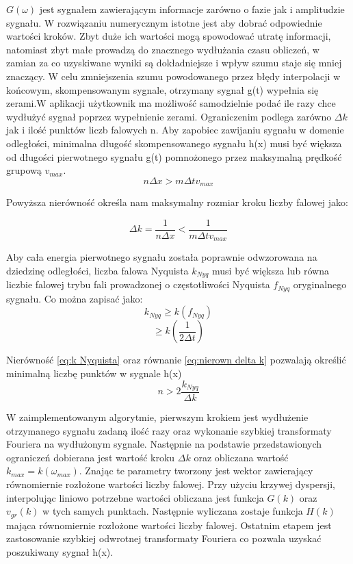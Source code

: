 $G(\omega)$ jest sygnałem zawierającym informacje zarówno o fazie jak i amplitudzie sygnału. W rozwiązaniu numerycznym istotne jest aby dobrać odpowiednie wartości kroków. Zbyt duże ich wartości mogą spowodować utratę informacji, natomiast zbyt małe prowadzą do znacznego wydłużania czasu obliczeń, w zamian za co uzyskiwane wyniki są dokładniejsze i wpływ szumu staje się mniej znaczący. W celu zmniejszenia szumu powodowanego przez błędy interpolacji w końcowym, skompensowanym sygnale, otrzymany sygnał g(t) wypełnia się zerami.W aplikacji użytkownik ma możliwość samodzielnie podać ile razy chce wydłużyć sygnał poprzez wypełnienie zerami. Ograniczenim podlega zarówno $\Delta k$ jak i ilość punktów liczb falowych n. Aby zapobiec zawijaniu sygnału w domenie odległości, minimalna długość skompensowanego sygnału h(x) musi być większa od długości pierwotnego sygnału g(t) pomnożonego przez maksymalną prędkość grupową $v_{max}$.
\begin{equation}
n\Delta x > m\Delta tv_{max}\label{eq:nierownosc dlugosci sygnalow}
\end{equation} 

Powyższa nierówność określa nam maksymalny rozmiar kroku liczby falowej jako:

\begin{equation}
\Delta k = \frac{1}{n\Delta x} < \frac{1}{ m\Delta tv_{max}}\label{eq:nierown delta k}
\end{equation}

Aby cała energia pierwotnego sygnału została poprawnie odwzorowana na dziedzinę odległości, liczba falowa Nyquista $k_{Nyq}$ musi być większa lub równa liczbie falowej trybu fali prowadzonej o częstotliwości Nyquista $f_{Nyq}$ oryginalnego sygnału. Co można zapisać jako:
\begin{equation}
k_{Nyq}\geq k(f_{Nyq})\label{eq:k Nyquista}
\end{equation}
$$
\geq k(\frac{1}{2\Delta t})
$$

Nierówność \ref{eq:k Nyquista} oraz równanie \ref{eq:nierown delta k} pozwalają określić minimalną liczbę punktów w sygnale h(x)
\begin{equation}
n > 2\frac{k_{Nyq}}{\Delta k}
\end{equation}

W zaimplementowanym algorytmie, pierwszym krokiem jest wydłużenie otrzymanego sygnału zadaną ilość razy oraz wykonanie szybkiej transformaty Fouriera na wydłużonym sygnale. Następnie na podstawie przedstawionych ograniczeń dobierana jest wartość kroku $\Delta k$ oraz obliczana wartość $k_{max} = k(\omega _{max})$. Znając te parametry tworzony jest wektor zawierający równomiernie rozłożone wartości liczby falowej. Przy użyciu krzywej dyspersji, interpolując liniowo potrzebne wartości obliczana jest funkcja $G(k)$ oraz $v_{gr}(k)$ w tych samych punktach. Następnie wyliczana zostaje funkcja $H(k)$ mająca równomiernie rozłożone wartości liczby falowej. Ostatnim etapem jest zastosowanie szybkiej odwrotnej transformaty Fouriera co pozwala uzyskać poszukiwany sygnał h(x).

